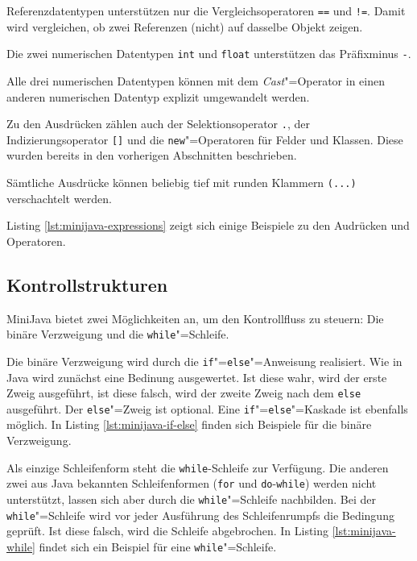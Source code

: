 Referenzdatentypen unterstützen nur die Vergleichsoperatoren \lstinline{==} und \lstinline{!=}. Damit wird vergleichen, ob zwei Referenzen (nicht) auf dasselbe Objekt zeigen.

Die zwei numerischen Datentypen \lstinline{int} und \lstinline{float} unterstützen das Präfixminus \lstinline{-}.

Alle drei numerischen Datentypen können mit dem \emph{Cast}"=Operator in einen anderen numerischen Datentyp explizit umgewandelt werden.

Zu den Ausdrücken zählen auch der Selektionsoperator \lstinline{.}, der Indizierungsoperator \lstinline{[]} und die \lstinline{new}"=Operatoren für Felder und Klassen. Diese wurden bereits in den vorherigen Abschnitten beschrieben.

Sämtliche Ausdrücke können beliebig tief mit runden Klammern \lstinline{(...)} verschachtelt werden.

Listing \ref{lst:minijava-expressions} zeigt sich einige Beispiele zu den Audrücken und Operatoren.



\subsection{Kontrollstrukturen}

MiniJava bietet zwei Möglichkeiten an, um den Kontrollfluss zu steuern: Die binäre Verzweigung und die \lstinline{while}"=Schleife.

Die binäre Verzweigung wird durch die \lstinline{if}"=\lstinline{else}"=Anweisung realisiert. Wie in Java wird zunächst eine Bedinung ausgewertet. Ist diese wahr, wird der erste Zweig ausgeführt, ist diese falsch, wird der zweite Zweig nach dem \lstinline{else} ausgeführt. Der \lstinline{else}"=Zweig ist optional. Eine \lstinline{if}"=\lstinline{else}"=Kaskade ist ebenfalls möglich. In Listing \ref{lst:minijava-if-else} finden sich Beispiele für die binäre Verzweigung.

\pagebreak


Als einzige Schleifenform steht die \lstinline{while}-Schleife zur Verfügung. Die anderen zwei aus Java bekannten Schleifenformen (\lstinline{for} und \lstinline{do}-\lstinline{while}) werden nicht unterstützt, lassen sich aber durch die \lstinline{while}"=Schleife nachbilden. Bei der \lstinline{while}"=Schleife wird vor jeder Ausführung des Schleifenrumpfs die Bedingung geprüft. Ist diese falsch, wird die Schleife abgebrochen. In Listing \ref{lst:minijava-while} findet sich ein Beispiel für eine \lstinline{while}"=Schleife.

